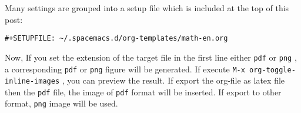 \documentclass[koma,a4paper,utopia,10pt,listings-color,microtype,paralist,colorlinks]{org-article}
\begin{document}
Many settings are grouped into a setup file which is included at the top of this
post:
\begin{verbatim}
#+SETUPFILE: ~/.spacemacs.d/org-templates/math-en.org
\end{verbatim}

Now, If you set the extension of the target file in the first line either \texttt{pdf} or
\texttt{png} , a corresponding \texttt{pdf} or \texttt{png} figure will be generated. If execute \texttt{M-x
org-toggle-inline-images}  , you can preview the result. If export the org-file
as latex file then the \texttt{pdf} file, the image of \texttt{pdf} format will be inserted. If
export to other format, \texttt{png} image will be used.
\end{document}
